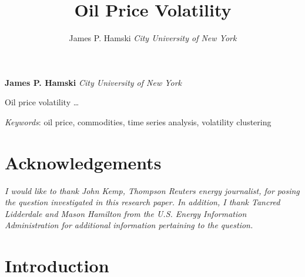 \documentclass[11pt,]{article}
\title{Oil Price Volatility  }
\author{\Large James P. Hamski\vspace{0.05in} \newline\normalsize\emph{City University of New York}  }
\date{}
\newcommand*{\authorfont}{\fontfamily{phv}\selectfont}
\renewenvironment{abstract}
 {{%
    \setlength{\leftmargin}{0mm}
    \setlength{\rightmargin}{\leftmargin}%
  }%
  \relax}
 {\endlist}
\begin{document}
%

{%
\setlength{\parindent}{0pt}
\thispagestyle{plain}
{\fontsize{18}{20}\selectfont\raggedright
\maketitle  %

}

{
   \vskip 13.5pt\relax \normalsize\fontsize{11}{12}
\textbf{\authorfont James P. Hamski} \hskip 15pt \emph{\small City University of New York}   

}

}







\begin{abstract}

    \hbox{\vrule height .2pt width 39.14pc}

    \vskip 8.5pt %

\noindent Oil price volatility \ldots{}


\vskip 8.5pt \noindent \emph{Keywords}: oil price, commodities, time series analysis, volatility clustering \par

    \hbox{\vrule height .2pt width 39.14pc}



\end{abstract}


\vskip 6.5pt

\noindent \doublespacing \section{Acknowledgements}\label{acknowledgements}

\emph{I would like to thank John Kemp, Thompson Reuters energy
journalist, for posing the question investigated in this research paper.
In addition, I thank Tancred Lidderdale and Mason Hamilton from the U.S.
Energy Information Administration for additional information pertaining
to the question.}

\section{Introduction}\label{introduction}
\end{document}
